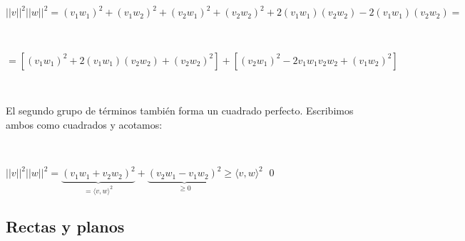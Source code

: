 \documentclass[a4paper,12pt,twoside,spanish,reqno]{amsbook}
\numberwithin{equation}{section}
\begin{document}
\begin{enumerate}
\

$||v||^2||w||^2 = (v_1 w_1)^2 + (v_1 w_2)^2 + (v_2 w_1)^2 + (v_2 w_2)^2 + 2(v_1w_1)(v_2w_2) - 2(v_1w_1)(v_2w_2) =$

\

$ = [(v_1 w_1)^2 + 2(v_1w_1)(v_2w_2) + (v_2 w_2)^2 ] + [(v_2 w_1)^2 - 2v_1w_1v_2w_2 + (v_1 w_2)^2 ] $

\

El segundo grupo de términos también forma un cuadrado perfecto. Escribimos ambos como cuadrados y acotamos:

\

$||v||^2||w||^2 = \underset{= \langle v,w \rangle^2}{ \underbrace{ (v_1w_1 + v_2w_2)^2} } + \underset{\geq 0}{ \underbrace{ (v_2w_1 - v_1w_2)^2}} \geq \langle v,w \rangle^2 $ \qed

\end{enumerate}

\subsection*{Rectas y planos}

\
\end{document}
